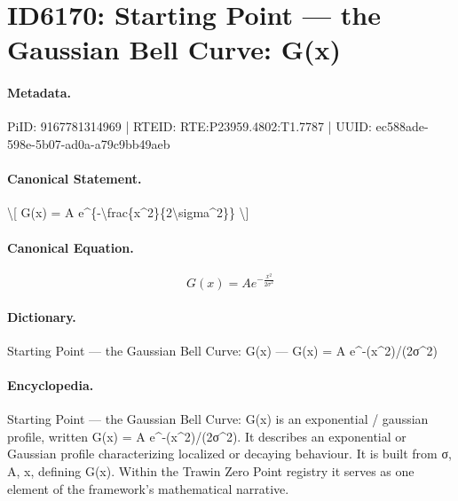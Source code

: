 \section*{ID6170: Starting Point — the Gaussian Bell Curve: G(x)}
\paragraph{Metadata.}
PiID: 9167781314969 | RTEID: RTE:P23959.4802:T1.7787 | UUID: ec588ade-598e-5b07-ad0a-a79c9bb49aeb

\paragraph{Canonical Statement.}
\textbackslash{}[ G(x) = A e\textasciicircum{}\{-\textbackslash{}frac\{x\textasciicircum{}2\}\{2\textbackslash{}sigma\textasciicircum{}2\}\} \textbackslash{}]

\paragraph{Canonical Equation.}
\[
G(x) = A e^{-\frac{x^2}{2\sigma^2}}
\]

\paragraph{Dictionary.}
Starting Point — the Gaussian Bell Curve: G(x) — G(x) = A e\textasciicircum{}-(x\textasciicircum{}2)/(2σ\textasciicircum{}2)

\paragraph{Encyclopedia.}
Starting Point — the Gaussian Bell Curve: G(x) is an exponential / gaussian profile, written G(x) = A e\textasciicircum{}-(x\textasciicircum{}2)/(2σ\textasciicircum{}2). It describes an exponential or Gaussian profile characterizing localized or decaying behaviour. It is built from σ, A, x, defining G(x). Within the Trawin Zero Point registry it serves as one element of the framework's mathematical narrative.
